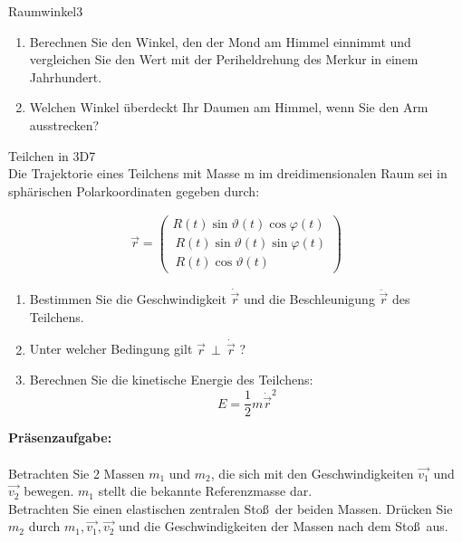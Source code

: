 \begin{exercise}{Raumwinkel}{3}
  \begin{enumerate}
    \item Berechnen Sie den Winkel, den der Mond am Himmel einnimmt und vergleichen
          Sie den Wert mit der Periheldrehung des Merkur in einem Jahrhundert.
    \item Welchen Winkel überdeckt Ihr Daumen am Himmel, wenn Sie den Arm ausstrecken?
  \end{enumerate}
\end{exercise}

\begin{exercise}{Teilchen in 3D}{7}\\
  Die Trajektorie eines Teilchens mit Masse m im dreidimensionalen Raum sei in
  sphärischen Polarkoordinaten gegeben durch:

  \begin{align}
    \vec{r} = \left( \begin{array}{c} R(t)\sin{\vartheta(t)}\cos{\varphi(t)} \\\
    R(t)\sin{\vartheta(t)}\sin{\varphi(t)} \\\ R(t)\cos{\vartheta(t)} \ \end{array}\right)
  \end{align}

  \begin{enumerate}
    \item Bestimmen Sie die Geschwindigkeit $\dot{\vec{r}}$ und die Beschleunigung
          $\ddot{\vec{r}}$ des Teilchens.
    \item Unter welcher Bedingung gilt $\vec{r} \, \perp \, \dot{\vec{r}}$ ?
    \item Berechnen Sie die kinetische Energie des Teilchens:
          \begin{equation}
            E = \frac{1}{2} m \dot{\vec{r}}^2
          \end{equation}
  \end{enumerate}
\end{exercise}


  \textbf{Präsenzaufgabe:} \\
  \\
  Betrachten Sie 2 Massen $m_1$ und $m_2$, die sich mit den Geschwindigkeiten
  $\vec{v_1}$ und $\vec{v_2}$ bewegen. $m_1$ stellt die bekannte Referenzmasse dar. \\
  Betrachten Sie einen elastischen zentralen Sto\ss\,\! der beiden Massen.
  Drücken Sie $m_2$ durch $m_1, \vec{v_1}, \vec{v_2}$ und die Geschwindigkeiten
  der Massen nach dem Sto\ss\,\! aus.
